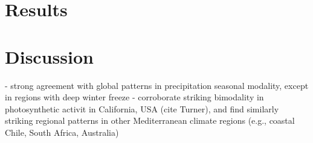 \documentclass[9pt,twocolumn,twoside,lineno]{pnas-new}
\begin{document}
\section*{Results}


\section*{Discussion}

- strong agreement with global patterns in precipitation seasonal modality, except in regions with deep winter freeze
- corroborate striking bimodality in photosynthetic activit in California, USA (cite Turner), and find similarly striking regional patterns in other Mediterranean climate regions (e.g., coastal Chile, South Africa, Australia)
\end{document}

